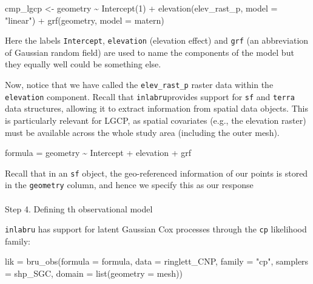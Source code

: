\documentclass[
  letterpaper,
  DIV=11,
  numbers=noendperiod]{scrartcl}
\makeatletter
\let\oldparagraph\paragraph
\renewcommand{\paragraph}{
    \@ifstar
      \xxxParagraphStar
      \xxxParagraphNoStar
  }
\newcommand{\xxxParagraphStar}[1]{\oldparagraph*{#1}\mbox{}}
\newcommand{\xxxParagraphNoStar}[1]{\oldparagraph{#1}\mbox{}}
\newenvironment{Shaded}{\begin{snugshade}}{\end{snugshade}}
\newcommand{\AttributeTok}[1]{\textcolor[rgb]{0.40,0.45,0.13}{#1}}
\newcommand{\DecValTok}[1]{\textcolor[rgb]{0.68,0.00,0.00}{#1}}
\newcommand{\FunctionTok}[1]{\textcolor[rgb]{0.28,0.35,0.67}{#1}}
\newcommand{\NormalTok}[1]{\textcolor[rgb]{0.00,0.23,0.31}{#1}}
\newcommand{\OtherTok}[1]{\textcolor[rgb]{0.00,0.23,0.31}{#1}}
\newcommand{\SpecialCharTok}[1]{\textcolor[rgb]{0.37,0.37,0.37}{#1}}
\newcommand{\StringTok}[1]{\textcolor[rgb]{0.13,0.47,0.30}{#1}}
\makeatother
\begin{document}
\begin{Shaded}
\begin{Highlighting}[]
\NormalTok{cmp\_lgcp }\OtherTok{\textless{}{-}}\NormalTok{  geometry }\SpecialCharTok{\textasciitilde{}}  \FunctionTok{Intercept}\NormalTok{(}\DecValTok{1}\NormalTok{)  }\SpecialCharTok{+} 
  \FunctionTok{elevation}\NormalTok{(elev\_rast\_p, }\AttributeTok{model =} \StringTok{"linear"}\NormalTok{) }\SpecialCharTok{+}
  \FunctionTok{grf}\NormalTok{(geometry, }\AttributeTok{model =}\NormalTok{ matern)}
\end{Highlighting}
\end{Shaded}

Here the labels \texttt{Intercept}, \texttt{elevation} (elevation
effect) and \texttt{grf} (an abbreviation of Gaussian random field) are
used to name the components of the model but they equally well could be
something else.

Now, notice that we have called the \texttt{elev\_rast\_p} raster data
within the \texttt{elevation} component. Recall that
\texttt{inlabru}provides support for \texttt{sf} and \texttt{terra} data
structures, allowing it to extract information from spatial data
objects. This is particularly relevant for LGCP, as spatial covariates
(e.g., the elevation raster) must be available across the whole study
area (including the outer mesh).

\begin{Shaded}
\begin{Highlighting}[]
\NormalTok{formula }\OtherTok{=}\NormalTok{ geometry }\SpecialCharTok{\textasciitilde{}}\NormalTok{ Intercept  }\SpecialCharTok{+}\NormalTok{ elevation }\SpecialCharTok{+}\NormalTok{ grf}
\end{Highlighting}
\end{Shaded}

Recall that in an \texttt{sf} object, the geo-referenced information of
our points is stored in the \texttt{geometry} column, and hence we
specify this as our response

\paragraph{Step 4. Defining th observational
model}\label{step-4.-defining-th-observational-model}

\texttt{inlabru} has support for latent Gaussian Cox processes through
the \texttt{cp} likelihood family:

\begin{Shaded}
\begin{Highlighting}[]
\NormalTok{lik }\OtherTok{=} \FunctionTok{bru\_obs}\NormalTok{(}\AttributeTok{formula =}\NormalTok{ formula, }
              \AttributeTok{data =}\NormalTok{ ringlett\_CNP, }
              \AttributeTok{family =} \StringTok{"cp"}\NormalTok{,}
              \AttributeTok{samplers =}\NormalTok{ shp\_SGC,}
              \AttributeTok{domain =} \FunctionTok{list}\NormalTok{(}\AttributeTok{geometry =}\NormalTok{ mesh))}
\end{Highlighting}
\end{Shaded}
\end{document}
